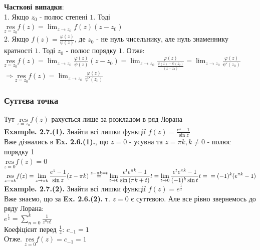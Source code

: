 \documentclass[a4paper, 14pt]{extarticle}
\def\residue#1#2{\underset{z = {#1}}{\textrm{res}} {#2}}
\def\hugespace{\vspace{5mm} \\}
\begin{document}
\textbf{Часткові випадки}:\\
1. Якщо $z_0$ - полюс степені $1$. Тоді\\ $\displaystyle \residue{z_0}{f(z)} = \lim_{z \to z_0} f(z)(z-z_0)$
\hugespace
2. Якщо $\displaystyle f(z) = \frac{\varphi (z)}{\psi (z)}$, де $z_0$ - не нуль чисельнику, але нуль знаменнику кратності $1$. Тоді $z_0$ - полюс порядку $1$. Отже:\\
$\displaystyle \residue{z_0}{f(z)} = \lim_{z \to z_0} \frac{\varphi (z)}{\psi (z)} (z-z_0) = \lim_{z \to z_0} \frac{\varphi (z)}{\displaystyle\frac{\psi (z)-\psi (z_0)}{(z-z_0)}} = \lim_{z \to z_0} \frac{\varphi(z)}{\psi'(z_0)}$\\
$\Rightarrow \displaystyle \residue{z_0}{f(z)} = \lim_{z \to z_0} \frac{\varphi(z)}{\psi'(z_0)}$
\hugespace

\subsubsection{Суттєва точка}
Тут $\residue{z_0}{f(z)}$ рахується лише за розкладом в ряд Лорана
\hugespace
\textbf{Example. 2.7.(1).} Знайти всі лишки функції $\displaystyle f(z) = \frac{e^z-1}{\sin z}$\\
Вже дізнались в \textbf{Ex. 2.6.(1).}, що $z = 0$ - усувна та $z = \pi k, k \neq 0$ - полюс порядку 1\\
$\residue{0}{f(z)} = 0$\\
$\displaystyle \residue{\pi k}{f(z)} = \lim_{z \to \pi k} \frac{e^z-1}{\sin z} (z - \pi k) \overset{z - \pi k = t}{=} \lim_{t \to 0} \frac{e^{t}e^{\pi k} - 1}{\sin{(\pi k + t)}} t = \lim_{t \to 0} \frac{e^{t}e^{\pi k} - 1}{(-1)^k\sin{t}} t = \\ = (-1)^k (e^{\pi k} - 1)$
\hugespace
\textbf{Example. 2.7.(2).} Знайти всі лишки функції $\displaystyle f(z) = e^{\textstyle \frac{1}{z}}$\\
Вже знаємо, що за \textbf{Ex. 2.6.(2).} т. $z = 0$ є суттєвою. Але все рівно звернемось до ряду Лорана:\\
$\displaystyle e^{\textstyle \frac{1}{z}} = \sum_{n=0}^k \frac{1}{z^n n!}$\\
Коефіцієнт перед $\displaystyle \frac{1}{z}$: $c_{-1} = 1$\\
Отже. $\residue{0}{f(z)} = c_{-1} = 1$
\hugespace
\end{document}
